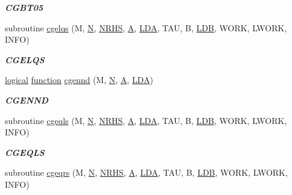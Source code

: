 \begin{DoxyCompactItemize}
\begin{DoxyCompactList}\small\item\em {\bfseries C\+G\+B\+T05} \end{DoxyCompactList}\item 
subroutine \hyperlink{group__complex__lin_ga37d32d0b974b4e35484ccf0562d30841}{cgelqs} (M, \hyperlink{polmisc_8c_a0240ac851181b84ac374872dc5434ee4}{N}, \hyperlink{example__user_8c_aa0138da002ce2a90360df2f521eb3198}{N\+R\+H\+S}, \hyperlink{classA}{A}, \hyperlink{example__user_8c_ae946da542ce0db94dced19b2ecefd1aa}{L\+D\+A}, T\+A\+U, B, \hyperlink{example__user_8c_a50e90a7104df172b5a89a06c47fcca04}{L\+D\+B}, W\+O\+R\+K, L\+W\+O\+R\+K, I\+N\+F\+O)
\begin{DoxyCompactList}\small\item\em {\bfseries C\+G\+E\+L\+Q\+S} \end{DoxyCompactList}\item 
\hyperlink{tnc_8c_aa7b64cdf39500931f7b333343791a104}{logical} \hyperlink{afunc_8m_a7b5e596df91eadea6c537c0825e894a7}{function} \hyperlink{group__complex__lin_gab6879edeea92e3d3d9a209cbef5e923a}{cgennd} (M, \hyperlink{polmisc_8c_a0240ac851181b84ac374872dc5434ee4}{N}, \hyperlink{classA}{A}, \hyperlink{example__user_8c_ae946da542ce0db94dced19b2ecefd1aa}{L\+D\+A})
\begin{DoxyCompactList}\small\item\em {\bfseries C\+G\+E\+N\+N\+D} \end{DoxyCompactList}\item 
subroutine \hyperlink{group__complex__lin_gae8d5c3093721c6e40501b38748e3d8df}{cgeqls} (M, \hyperlink{polmisc_8c_a0240ac851181b84ac374872dc5434ee4}{N}, \hyperlink{example__user_8c_aa0138da002ce2a90360df2f521eb3198}{N\+R\+H\+S}, \hyperlink{classA}{A}, \hyperlink{example__user_8c_ae946da542ce0db94dced19b2ecefd1aa}{L\+D\+A}, T\+A\+U, B, \hyperlink{example__user_8c_a50e90a7104df172b5a89a06c47fcca04}{L\+D\+B}, W\+O\+R\+K, L\+W\+O\+R\+K, I\+N\+F\+O)
\begin{DoxyCompactList}\small\item\em {\bfseries C\+G\+E\+Q\+L\+S} \end{DoxyCompactList}\item 
subroutine \hyperlink{group__complex__lin_ga249f7efd2c08e4cc1493542240b8e3a3}{cgeqrs} (M, \hyperlink{polmisc_8c_a0240ac851181b84ac374872dc5434ee4}{N}, \hyperlink{example__user_8c_aa0138da002ce2a90360df2f521eb3198}{N\+R\+H\+S}, \hyperlink{classA}{A}, \hyperlink{example__user_8c_ae946da542ce0db94dced19b2ecefd1aa}{L\+D\+A}, T\+A\+U, B, \hyperlink{example__user_8c_a50e90a7104df172b5a89a06c47fcca04}{L\+D\+B}, W\+O\+R\+K, L\+W\+O\+R\+K, I\+N\+F\+O)

\end{DoxyCompactItemize}
